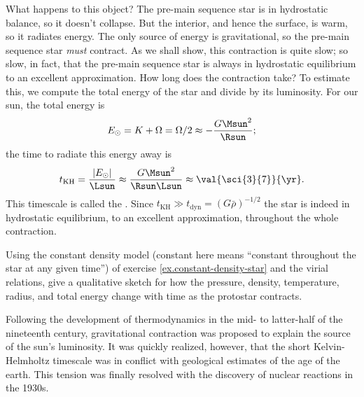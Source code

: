 What happens to this object?
The pre-main sequence star is in hydrostatic balance, so it doesn't collapse. But the interior, and hence the surface, is warm, so it radiates energy.  The only source of energy is gravitational, so the pre-main sequence star \emph{must} contract. As we shall show, this contraction is quite slow; so slow, in fact, that the pre-main sequence star is always in hydrostatic equilibrium to an excellent approximation. How long does the contraction take? To estimate this, we compute the total energy of the star and divide by its luminosity. For our sun, the total energy is
\[
	E_{\odot} = K + \Omega = \Omega/2 \approx -\frac{G\Msun^{2}}{\Rsun};
\]
the time to radiate this energy away is
\begin{equation}\label{e.kelvin-helmholtz}
t_{\mathrm{KH}} = \frac{|E_{\odot}|}{\Lsun} \approx \frac{G\Msun^{2}}{\Rsun\Lsun} \approx \val{\sci{3}{7}}{\yr}.
\end{equation}
This timescale is called the .  Since $t_{\mathrm{KH}} \gg t_{\mathrm{dyn}} = (G\bar{\rho})^{-1/2}$ the star is indeed in hydrostatic equilibrium, to an excellent approximation, throughout the whole contraction.

\begin{exercisebox}
\label{ex.contraction-constant-density-protostar}
Using the constant density model (constant here means ``constant throughout the star at any given time'') of exercise \ref{ex.constant-density-star} and the virial relations, give a qualitative sketch for how the pressure, density, temperature, radius, and total energy change with time as the protostar contracts.
\end{exercisebox}

Following the development of thermodynamics in the mid- to latter-half of the nineteenth century, gravitational contraction was proposed to explain the source of the sun's luminosity. It was quickly realized, however, that the short Kelvin-Helmholtz timescale was in conflict with geological estimates of the age of the earth. This tension was finally resolved with the discovery of nuclear reactions in the 1930s.
